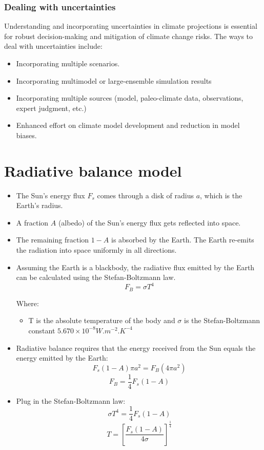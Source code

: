\documentclass[11pt]{article}
\begin{document}
\subsubsection{Dealing with uncertainties}
\label{sec:org92ab117}
Understanding and incorporating uncertainties in climate projections is essential for robust decision-making and mitigation of climate change risks. The ways to deal with uncertainties include:
\begin{itemize}
\item Incorporating multiple scenarios.
\item Incorporating multimodel or large-ensemble simulation results
\item Incorporating multiple sources (model, paleo-climate data, observations, expert judgment, etc.)
\item Enhanced effort on climate model development and reduction in model biases.
\end{itemize}

\newpage
\section{Radiative balance model}
\label{sec:org5bbf09b}
\begin{itemize}
\item The Sun's energy flux \(F_{s}\) comes through a disk of radius \(a\), which is the Earth's radius.
\item A fraction \(A\) (albedo) of the Sun's energy flux gets reflected into space.
\item The remaining fraction \(1-A\) is absorbed by the Earth. The Earth re-emits the radiation into space uniformly in all directions.
\item Assuming the Earth is a blackbody, the radiative flux emitted by the Earth can be calculated using the Stefan-Boltzmann law.
\[F_B = \sigma T^4\]

Where:
\begin{itemize}
\item T is the absolute temperature of the body and \(\sigma\) is the Stefan-Boltzmann constant \(5.670 \times 10^{-8} \unit{W.m^{-2}.K^{-4}}\)
\end{itemize}

\item Radiative balance requires that the energy received from the Sun equals the energy emitted by the Earth:
\[F_s (1-A) \pi a^2 = F_B (4 \pi a^2)\]
\[F_B = \frac{1}{4} F_s(1-A)\]

\item Plug in the Stefan-Boltzmann law:
\[\sigma T^4 = \frac{1}{4} F_s (1-A)\]
\[T = \left[ \frac{F_s(1-A)}{4 \sigma} \right] ^{\frac{1}{4}}\]
\end{itemize}
\end{document}
